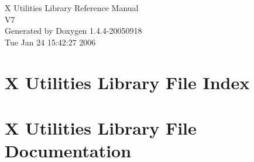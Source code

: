 \documentclass[a4paper]{article}
\begin{document}
\begin{titlepage}
\vspace*{7cm}
\begin{center}
{\Large X Utilities Library Reference Manual\\[1ex]\large V7 }\\
\vspace*{1cm}
{\large Generated by Doxygen 1.4.4-20050918}\\
\vspace*{0.5cm}
{\small Tue Jan 24 15:42:27 2006}\\
\end{center}
\end{titlepage}
\tableofcontents
{}
\section{X Utilities Library File Index}

\section{X Utilities Library File Documentation}




\printindex
\end{document}

